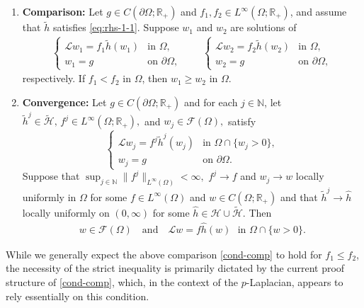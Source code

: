 \documentclass[11pt,oneside,english]{amsart}
\newcommand{\R}{{\mathbb R}}
\newcommand{\N}{{\mathbb N}}
\newcommand{\cL}{{\mathcal L}}
\newcommand{\cH}{{\mathcal H}}
\newcommand{\cF}{{\mathcal F}}
\numberwithin{equation}{section}
\theoremstyle{plain}
\numberwithin{equation}{section}
\begin{document}
\begin{enumerate}[label={\bf (PE\arabic*)}]
       

    \medskip

    \item\label{cond-comp} {\bf Comparison:} Let $g\in C(\partial\Omega;\R_+)$ and $f_1,f_2\in L^\infty(\Omega;\R_+)$, and assume that $\tilde h$ satisfies \eqref{eq:rhs-1-1}. Suppose $w_1$ and $w_2$ are solutions of
    \begin{align*}
        \begin{cases}
            \cL w_1=f_1\tilde h(w_1)&\text{in }\Omega,\\
            w_1=g&\text{on }\partial\Omega,
        \end{cases}\qquad
        \begin{cases}
            \cL w_2=f_2\tilde h(w_2)&\text{in }\Omega,\\
            w_2=g&\text{on }\partial\Omega,
        \end{cases}
    \end{align*}
    respectively. 
   If $f_1<f_2$ in $\Omega$, then $w_1\ge w_2$ in $\Omega$.



   \medskip


    \item\label{cond-conv} {\bf Convergence:} Let $g\in C(\partial\Omega;\R_+)$ and for each $j\in \N$, let    $\tilde h^j\in \widetilde{\mathcal H}, \,f^j\in L^\infty(\Omega;\mathbb R_+), $ and $w_j\in\mathcal F(\Omega),$
satisfy
    $$
    \begin{cases}
        \cL w_j=f^j\tilde h^j(w_j)&\text{in }\Omega\cap\{w_j>0\},\\
        w_j=g&\text{on }\partial\Omega.
    \end{cases}
    $$ 
    Suppose that
$\sup_{j\in\mathbb N}\|f^j\|_{L^\infty(\Omega)}<\infty,$  $f^j\to f$ and $w_j\to w$ locally uniformly in $\Omega$ for some $f\in L^\infty(\Omega)$ and $w\in C(\Omega;\R_+)$ and that $\tilde h^j\to  \hat  h $ locally uniformly on $(0,\infty)$ for some $\hat h\in  \cH\cup\widetilde\cH$.
Then
    \begin{align*}
            w\in \cF(\Omega)\quad\text{and}\quad  \cL w=f\hat h(w)\,\,\text{ in }\Omega\cap\{w>0\}.
    \end{align*}
\end{enumerate}


While we generally expect the above comparison \ref{cond-comp} to hold for $f_1 \leq f_2$, the necessity of the strict inequality  is primarily dictated by the current proof structure of \ref{cond-comp}, which, in the context of the $p$-Laplacian, appears to rely essentially on this condition.
\end{document}
